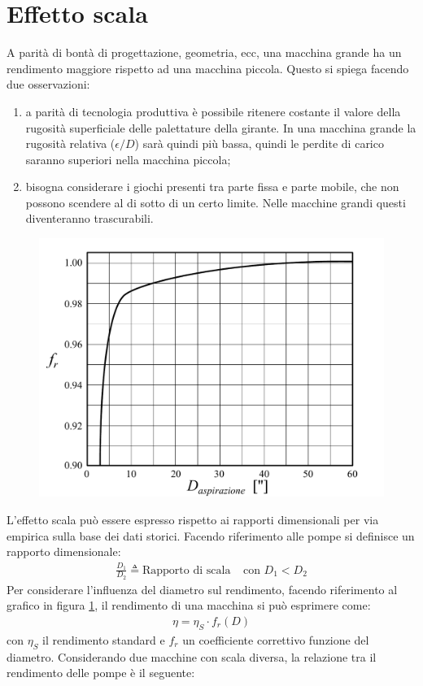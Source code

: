 \section{Effetto scala}
A parità di bontà di progettazione, geometria, ecc, una macchina grande ha un rendimento maggiore rispetto ad una macchina piccola. Questo si spiega facendo due osservazioni: 
\begin{enumerate}
	\item a parità di tecnologia produttiva è possibile ritenere costante il valore della rugosità superficiale delle palettature della girante. In una macchina grande la rugosità relativa ($\epsilon/D$) sarà quindi più bassa, quindi le perdite di carico saranno superiori nella macchina piccola;
	\item bisogna considerare i giochi presenti tra parte fissa e parte mobile, che non possono scendere al di sotto di un certo limite. Nelle macchine grandi questi diventeranno trascurabili. 
\end{enumerate}
\begin{figure}
\centering
  \includegraphics[width=.5\textwidth]{fig/dDchart.pdf}
\caption{}
\label{fig:dDchart}
\end{figure}
L'effetto scala può essere espresso rispetto ai rapporti dimensionali per via empirica sulla base dei dati storici. Facendo riferimento alle pompe si definisce un rapporto dimensionale:
\begin{align*}
\frac{D_1}{D_2} \triangleq  \mbox{Rapporto di scala} \;\;\;\; \text{con } D_1 < D_2
\end{align*}
Per considerare l'influenza del diametro sul rendimento, facendo riferimento al grafico in figura \ref{fig:dDchart}, il rendimento di una macchina si può esprimere come:
\begin{align*}
\eta = \eta_S \cdot f_r(D)
\end{align*}
con $\eta_S$ il rendimento standard e $f_r$ un coefficiente correttivo funzione del diametro. Considerando due macchine con scala diversa, la relazione tra il rendimento delle pompe è il seguente:
